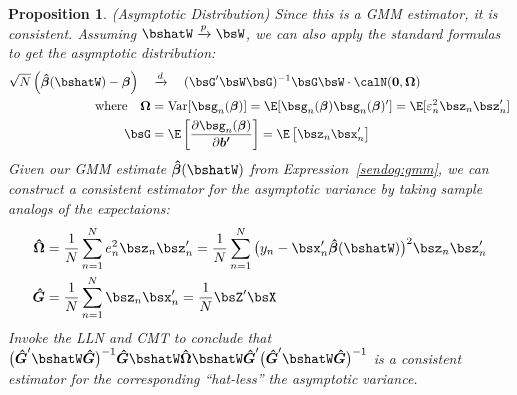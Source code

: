 \documentclass[12pt]{article}
\theoremstyle{plain}
\newtheorem{prop}[thm]{Proposition}
\theoremstyle{definition}
\theoremstyle{remark}
\newcommand{\bsvarepsilon}{\boldsymbol{\varepsilon}}
\newcommand{\bsbeta}{\boldsymbol{\beta}}
\newcommand{\bshatG}{\boldsymbol{\hat{G}}}
\newcommand{\bsOmega}{\boldsymbol{\Omega}}
\newcommand{\bshatbeta}{\boldsymbol{\hat{\beta}}}
\newcommand{\bshatOmega}{\boldsymbol{\hat{\Omega}}}
\renewcommand{\bso}{\boldsymbol{0}}
\newcommand{\bsbp}{\boldsymbol{b'}}
\newcommand{\Var}{\operatorname{Var}}
\newcommand{\pto}{\xrightarrow{p}}
\newcommand{\dto}{\xrightarrow{d}}
\newcommand{\sumnN}{\sum^N_{n=1}}
\begin{document}

\begin{prop}\emph{(Asymptotic Distribution)}
\label{prop:gmmasymptotics}
Since this is a GMM estimator, it is consistent. Assuming
$\bshatW\pto\bsW$, we can also apply the standard formulas to get the
asymptotic distribution:
\begin{align*}
  \sqrt{N}\left(\bshatbeta(\bshatW) - \bsbeta\right)
  \quad &\dto \quad
  (\bsG'\bsW\bsG)^{-1}\bsG\bsW\cdot
  \calN(\bso,\bsOmega) \\
  \text{where}\quad
  \bsOmega &=
    \Var[\bsg_n(\bsbeta)] =
    \E[\bsg_n(\bsbeta)\bsg_n(\bsbeta)']
    = \E[\varepsilon_n^2 \bsz_n\bsz_n']
  \\
  \bsG &=
  \E\left[
    \frac{\partial \bsg_n(\bsbeta)}{\partial \bsbp}
  \right]
  =
  \E\left[
    \bsz_n\bsx_n'
  \right]
\end{align*}
Given our GMM estimate $\bshatbeta(\bshatW)$ from
Expression~\ref{sendog:gmm}, we can construct a consistent estimator for
the asymptotic variance by taking sample analogs of the expectaions:
\begin{align*}
  \bshatOmega &=
  \frac{1}{N}\sumnN e_n^2\bsz_n\bsz_n'
  =
  \frac{1}{N}\sumnN \big(y_n-\bsx_n'\bshatbeta(\bshatW)\big)^2\bsz_n\bsz_n'
  \\
  \bshatG
  &=
  \frac{1}{N}\sumnN
  \bsz_n\bsx_n'
  = \frac{1}{N}\bsZ'\bsX
\end{align*}
Invoke the LLN and CMT to conclude that
$\big(\bshatG'\bshatW\bshatG\big)^{-1}
\bshatG\bshatW\bshatOmega
\bshatW\bshatG'
\big(\bshatG'\bshatW\bshatG\big)^{-1}$
is a consistent estimator for the corresponding ``hat-less'' the
asymptotic variance.
\end{prop}
\end{document}
